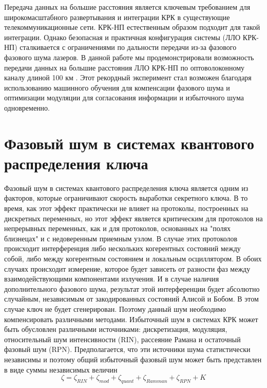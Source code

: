 \newline Передача данных на большие расстояния является ключевым требованием для широкомасштабного развертывания и интеграции КРК в существующие телекоммуникационные сети. КРК-НП естественным образом подходит для такой интеграции. Однако безопасная и практичная конфигурация системы (ЛЛО КРК-НП) сталкивается с ограничениями по дальности передачи из-за фазового
фазового шума лазеров. В данной работе мы продемонстрировали возможность передачи данных на большие расстояния ЛЛО КРК-НП по оптоволоконному каналу длиной 100 км . Этот рекордный эксперимент стал возможен благодаря использованию машинного обучения для компенсации фазового шума и оптимизации модуляции для согласования информации и избыточного шума одновременно.

\section{Фазовый шум в системах квантового распределения ключа}\label{sec:ch1/sect5}
Фазовый шум в системах квантового распределения ключа является одним из факторов, которые ограничивают скорость выработки секретного ключа. В то время, как этот эффект практически не влияет на протоколы, построенных на дискретных переменных, но этот эффект является критическим для протоколов на непрерывных переменных, как и для протоколов, основанных на "полях близнецах" и с недоверенным приемным узлом. В случае этих протоколов происходит интерференция либо нескольких когерентных состояний между собой, либо между когерентным состоянием и локальным осциллятором. В обоих случаях происходит измерение, которое будет зависеть от разности фаз между взаимодействующими компонентами излучения. И в случае наличия дополнительного фазового шума, результат этой интерференции будет абсолютно случайным, независимым от закодированных состояний Алисой и Бобом. В этом случае ключ не будет сгенерирован. Поэтому данный шум необходимо компенсировать различными методами.
\newline Избыточный шум в системах КРК может быть обусловлен различными источниками: дискретизация, модуляция, относительный шум интенсивности (RIN), рассеяние Рамана и  остаточный фазовый шум (RPN). Предполагается, что эти источники шума статистически независимы и поэтому общий избыточный фазовый шум может быть представлен в виде суммы независимых величин
\begin{equation}
    \zeta = \zeta_{RIN} + \zeta_{mod} + \zeta_{quant} + \zeta_{Ramman} + \zeta_{RPN} + K
\end{equation}\label{eq:noise lit}
